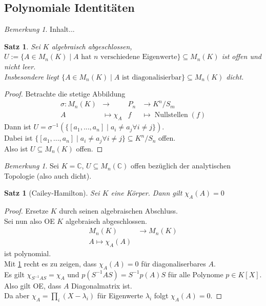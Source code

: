 \documentclass[10pt,a4paper]{article}
\newcommand{\C}{\ensuremath{\mathbb{C}}}
\newcommand{\la}{\ensuremath{\lambda}}
\newcounter{thm}[section]
\theoremstyle{definition}
\theoremstyle{plain}
\newtheorem{satz}[thm]{Satz}
\theoremstyle{remark}
\newtheorem{bem}[thm]{Bemerkung}
\newtheorem*{bem*}{Bemerkung}
\begin{document}
\subsection{Polynomiale Identitäten}

\begin{bem}
	Inhalt...
\end{bem}

\setcounter{thm}{17}
\begin{satz}\label{1218satz}
	Sei $K$ algebraisch abgeschlossen, $U:=\{A\in M_n(K)\mid\text{$A$ hat $n$ verschiedene Eigenwerte}\}\subseteq M_n(K)$ ist offen und nicht leer.\\
	Insbesondere liegt $\{A\in M_n(K)\mid\text{$A$ ist diagonalisierbar}\}\subseteq M_n(K)$ dicht. 
\end{satz}
\begin{proof}
	Betrachte die stetige Abbildung
	\begin{align*}
	\sigma:M_n(K)&\to &P_n&\to K^n/S_m\\
	A&\mapsto\chi_A&f&\mapsto\operatorname{Nullstellen}(f)
	\end{align*}
	Dann ist $U=\sigma^{-1}(\{[a_1,...,a_n]\mid a_i\neq a_j\forall i\neq j\})$.\\
	Dabei ist $\{[a_1,...,a_n]\mid a_i\neq a_j\forall i\neq j\}\subseteq K^n/S_n$ offen.\\
	Also ist $U\subseteq M_n(K)$ offen. 
\end{proof}
\begin{bem*}
	Sei $K=\C$, $U\subseteq M_n(\C)$ offen bezüglich der analytischen Topologie (also auch dicht).
\end{bem*}

\begin{satz}[Cailey-Hamilton]\label{1219caiham}
	Sei $K$ eine Körper. Dann gilt $\chi_A(A)=0$
\end{satz}
\begin{proof}
	Ersetze $K$ durch seinen algebraischen Abschluss.\\
	Sei nun also OE $K$ algebraisch abgeschlossen.
	\begin{align*}
	M_n(K)&\to M_n(K)\\A\mapsto\chi_A(A)
	\end{align*}
	ist polynomial.\\
	Mit \ref{1218satz} recht es zu zeigen, dass $\chi_A(A)=0$ für diagonaliserbares $A$.\\
	Es gilt $\chi_{S^{-1}AS}=\chi_A$ und $p(S^{-1}AS)=S^{-1}p(A)S$ für alle Polynome $p\in K[X]$.\\
	Also gilt OE, dass $A$ Diagonalmatrix ist.\\
	Da aber $\chi_A=\prod_{i}(X-\la_i)$ für Eigenwerte $\la_i$ folgt $\chi_A(A)=0$.
\end{proof}
\end{document}
